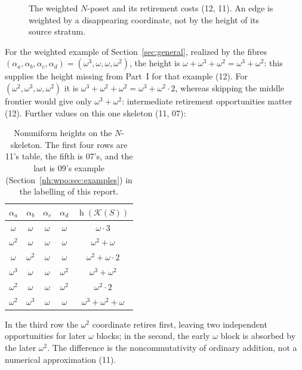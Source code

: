 \documentclass[11pt,a4paper]{article}
\theoremstyle{definition}
\theoremstyle{remark}
\newcommand{\K}{\mathcal K}
\newcommand{\hgt}{\operatorname{h}}
\begin{document}
\begin{figure}[htbp]
\centering
{}
\caption{The weighted $N$-poset and its retirement costs (12, 11). An edge is
weighted by a disappearing coordinate, not by the height of its source stratum.}
\label{nh:fig:N}
\end{figure}

For the weighted example of Section~\ref{sec:general}, realized by the fibres
$(\alpha_a,\alpha_b,\alpha_c,\alpha_d)=(\omega^3,\omega,\omega,\omega^2)$, the
height is $\omega+\omega^3+\omega^2=\omega^3+\omega^2$: this supplies the
height missing from Part~I for that example (12). For
$(\omega^2,\omega^3,\omega,\omega^2)$ it is $\omega^3+\omega^2+\omega^2=
\omega^3+\omega^2\cdot2$, whereas skipping the middle frontier would give only
$\omega^3+\omega^2$: intermediate retirement opportunities matter (12). Further
values on this one skeleton (11, 07):
\begin{table}[htbp]
\centering
\renewcommand{\arraystretch}{1.18}
\begin{tabular}{@{}ccccc@{}}
\toprule
$\alpha_a$ & $\alpha_b$ & $\alpha_c$ & $\alpha_d$ & $\hgt(\K(S))$\\
\midrule
$\omega$ & $\omega$ & $\omega$ & $\omega$ & $\omega\cdot3$\\
$\omega^2$ & $\omega$ & $\omega$ & $\omega$ & $\omega^2+\omega$\\
$\omega$ & $\omega^2$ & $\omega$ & $\omega$ & $\omega^2+\omega\cdot2$\\
$\omega^3$ & $\omega$ & $\omega$ & $\omega^2$ & $\omega^3+\omega^2$\\
$\omega^2$ & $\omega$ & $\omega$ & $\omega^2$ & $\omega^2\cdot2$\\
$\omega^2$ & $\omega^3$ & $\omega$ & $\omega$ & $\omega^3+\omega^2+\omega$\\
\bottomrule
\end{tabular}
\caption{Nonuniform heights on the $N$-skeleton. The first four rows are 11's
table, the fifth is 07's, and the last is 09's example (Section~\ref{nh:wpo:sec:examples})
in the labelling of this report.}
\label{nh:tab:N}
\end{table}
In the third row the $\omega^2$ coordinate retires first, leaving two
independent opportunities for later $\omega$ blocks; in the second, the early
$\omega$ block is absorbed by the later $\omega^2$. The difference is the
noncommutativity of ordinary addition, not a numerical approximation (11).
\end{document}
